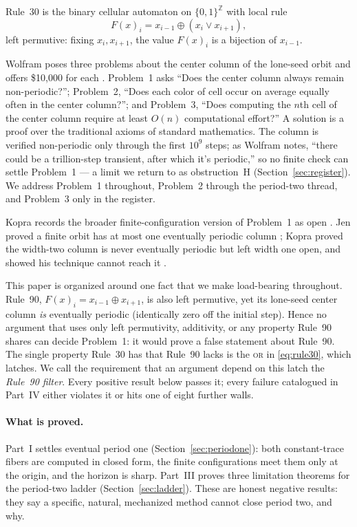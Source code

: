 \documentclass[11pt]{article}
\theoremstyle{definition}
\begin{document}
Rule~30 is the binary cellular automaton on $\{0,1\}^{\mathbb Z}$ with local rule
\begin{equation}\label{eq:rule30}
 F(x)_i=x_{i-1}\oplus(x_i\lor x_{i+1}),
\end{equation}
left permutive: fixing $x_i,x_{i+1}$, the value $F(x)_i$ is a bijection of
$x_{i-1}$.

Wolfram poses three problems about the center column of the lone-seed orbit and
offers \$10{,}000 for each \cite{wolfram}. Problem~1 asks ``Does the center
column always remain non-periodic?''; Problem~2, ``Does each color of cell occur
on average equally often in the center column?''; and Problem~3, ``Does
computing the $n$th cell of the center column require at least $O(n)$
computational effort?'' A solution is a proof over the traditional axioms of
standard mathematics. The column is verified non-periodic only through the first
$10^9$ steps; as Wolfram notes, ``there could be a trillion-step transient,
after which it's periodic,'' so no finite check can settle Problem~1 --- a limit
we return to as obstruction~H (Section~\ref{sec:register}). We address Problem~1
throughout, Problem~2 through the period-two thread, and Problem~3 only in the
register.

Kopra records the broader finite-configuration version of Problem~1 as open
\cite{kopra-thesis}. Jen proved a finite orbit has at most one eventually
periodic column \cite[Thm.~2b]{jen1986}\cite[Prop.~3]{jen}; Kopra proved the
width-two column is never eventually periodic but left width one open, and
showed his technique cannot reach it \cite{kopra}.

This paper is organized around one fact that we make load-bearing throughout.
Rule~90, $F(x)_i = x_{i-1}\oplus x_{i+1}$, is also left permutive, yet its
lone-seed center column \emph{is} eventually periodic (identically zero off the
initial step). Hence no argument that uses only left permutivity, additivity, or
any property Rule~90 shares can decide Problem~1: it would prove a false
statement about Rule~90. The single property Rule~30 has that Rule~90 lacks is
the \textsc{or} in \eqref{eq:rule30}, which latches. We call the requirement that
an argument depend on this latch the \emph{Rule~90 filter}. Every positive
result below passes it; every failure catalogued in Part~IV either violates it
or hits one of eight further walls.

\paragraph{What is proved.} Part~I settles eventual period one
(Section~\ref{sec:periodone}): both constant-trace fibers are computed in closed
form, the finite configurations meet them only at the origin, and the horizon is
sharp. Part~III proves three limitation theorems for the period-two ladder
(Section~\ref{sec:ladder}). These are honest negative results: they say a
specific, natural, mechanized method cannot close period two, and why.
\end{document}
